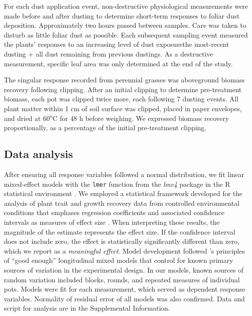 \documentclass{svjour3}
\begin{document}
For each dust application event, non-destructive physiological measurements were made before and after dusting to determine short-term responses to foliar dust deposition. 
Approximately two hours passed between samples.
Care was taken to disturb as little foliar dust as possible.
Each subsequent sampling event measured the plants' responses to an increasing level of dust exposure\textemdash the most-recent dusting + all dust remaining from previous dustings. 
As a destructive measurement, specific leaf area was only determined at the end of the study. 

The singular response recorded from perennial grasses was aboveground biomass recovery following clipping. 
After an initial clipping to determine pre-treatment biomass, each pot was clipped twice more, each following 7 dusting events. 
All plant matter within 1 cm of soil surface was clipped, placed in paper envelopes, and dried at 60$^\text{o}$C for 48 h before weighing.
We expressed biomass recovery proportionally, as a percentage of the initial pre-treatment clipping. 

\subsection{Data analysis}

After ensuring all response variables followed a normal distribution, we fit linear mixed-effect models with the \texttt{lmer} function from the \emph{lme4} package in the \textsf{R} statistical environment \citep{bates2015, rcoreteam2019}. 
We employed a statistical framework developed for the analysis of plant trait and growth recovery data from controlled environmental conditions that emphases regression coefficients and associated confidence intervals as measures of effect size \citep{rinella2010,mcgranahan2018, mcgranahan2018a}. 
When interpreting these results, the magnitude of the estimate represents the effect size.
If the confidence interval does not include zero, the effect is statistically significantly different than zero, which we report as a \emph{meaningful effect}.
Model development followed \citet{cheng2010}'s principles of ``good enough'' longitudinal mixed models that control for known primary sources of variation in the experimental design. 
In our models, known sources of random variation included blocks, rounds, and repeated measures of individual pots. 
Models were fit for each measurement, which served as dependent response variables. 
Normality of residual error of all models was also confirmed. 
Data and script for analysis are in the Supplemental Information. 
\end{document}
